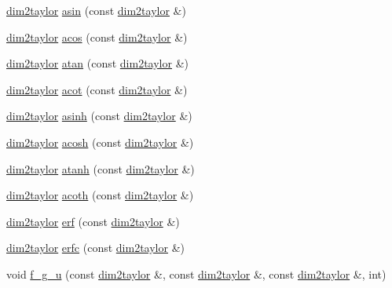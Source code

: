 \begin{DoxyCompactItemize}
\hyperlink{classtaylor_1_1dim2taylor}{dim2taylor} \hyperlink{classtaylor_1_1dim2taylor_a2482f3c0537187553577cc066bc7be02}{asin} (const \hyperlink{classtaylor_1_1dim2taylor}{dim2taylor} \&)
\item 
\hyperlink{classtaylor_1_1dim2taylor}{dim2taylor} \hyperlink{classtaylor_1_1dim2taylor_a998947a4015cc752416339e96be56bcd}{acos} (const \hyperlink{classtaylor_1_1dim2taylor}{dim2taylor} \&)
\item 
\hyperlink{classtaylor_1_1dim2taylor}{dim2taylor} \hyperlink{classtaylor_1_1dim2taylor_a356054c59d1ee1a4a04c377b1029c773}{atan} (const \hyperlink{classtaylor_1_1dim2taylor}{dim2taylor} \&)
\item 
\hyperlink{classtaylor_1_1dim2taylor}{dim2taylor} \hyperlink{classtaylor_1_1dim2taylor_addd4a90845a5143e8b9e6950a32d0618}{acot} (const \hyperlink{classtaylor_1_1dim2taylor}{dim2taylor} \&)
\item 
\hyperlink{classtaylor_1_1dim2taylor}{dim2taylor} \hyperlink{classtaylor_1_1dim2taylor_aff3dc8ab9145b558b7f60ae455fa0fdb}{asinh} (const \hyperlink{classtaylor_1_1dim2taylor}{dim2taylor} \&)
\item 
\hyperlink{classtaylor_1_1dim2taylor}{dim2taylor} \hyperlink{classtaylor_1_1dim2taylor_a90e7380360f327ec4acc83f8ee851710}{acosh} (const \hyperlink{classtaylor_1_1dim2taylor}{dim2taylor} \&)
\item 
\hyperlink{classtaylor_1_1dim2taylor}{dim2taylor} \hyperlink{classtaylor_1_1dim2taylor_a721ffaeb7fe159ba485eca03a00bbe56}{atanh} (const \hyperlink{classtaylor_1_1dim2taylor}{dim2taylor} \&)
\item 
\hyperlink{classtaylor_1_1dim2taylor}{dim2taylor} \hyperlink{classtaylor_1_1dim2taylor_af5ee0d6bc989b885c069e24afb9a545b}{acoth} (const \hyperlink{classtaylor_1_1dim2taylor}{dim2taylor} \&)
\item 
\hyperlink{classtaylor_1_1dim2taylor}{dim2taylor} \hyperlink{classtaylor_1_1dim2taylor_af895bd87e20ec4e15cba89fb56806188}{erf} (const \hyperlink{classtaylor_1_1dim2taylor}{dim2taylor} \&)
\item 
\hyperlink{classtaylor_1_1dim2taylor}{dim2taylor} \hyperlink{classtaylor_1_1dim2taylor_a42349afab7dd4af2f8853fce8aa6e168}{erfc} (const \hyperlink{classtaylor_1_1dim2taylor}{dim2taylor} \&)
\item 
void \hyperlink{classtaylor_1_1dim2taylor_a1990d432f619f0945b84ef4bdf5aa89b}{f\-\_\-g\-\_\-u} (const \hyperlink{classtaylor_1_1dim2taylor}{dim2taylor} \&, const \hyperlink{classtaylor_1_1dim2taylor}{dim2taylor} \&, const \hyperlink{classtaylor_1_1dim2taylor}{dim2taylor} \&, int)
\end{DoxyCompactItemize}


